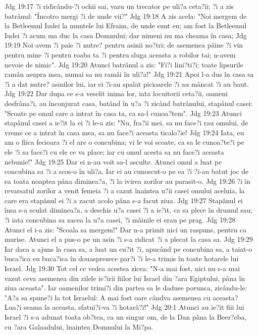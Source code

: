 Jdg 19:17  ?i ridicându-?i ochii sai, vazu un trecator pe uli?a ceta?ii; ?i a zis batrânul: "Încotro mergi ?i de unde vii?"
Jdg 19:18  A zis acela: "Noi mergem de la Betleemul Iudei la muntele lui Efraim, de unde sunt eu; am fost la Betleemul Iudei ?i acum ma duc la casa Domnului; dar nimeni nu ma cheama în casa;
Jdg 19:19  Noi avem ?i paie ?i nutre? pentru asinii no?tri; de asemenea pâine ?i vin pentru mine ?i pentru roaba ta ?i pentru sluga aceasta a robilor tai; n-avem nevoie de nimic".
Jdg 19:20  Atunci batrânul a zis: "Fi?i lini?ti?i; toate lipsurile ramân asupra mea, numai sa nu ramâi în uli?a!"
Jdg 19:21  Apoi l-a dus în casa sa ?i a dat nutre? asinilor lui, iar ei ?i-au spalat picioarele ?i au mâncat ?i au baut.
Jdg 19:22  Dar dupa ce s-a veselit inima lor, iata locuitorii ceta?ii, oameni desfrâna?i, au înconjurat casa, batând în u?a ?i zicând batrânului, stapânul casei: "Scoate pe omul care a intrat în casa ta, ca sa-l cunoa?tem".
Jdg 19:23  Atunci stapânul casei a ie?it la ei ?i le-a zis: "Nu, fra?ii mei, sa nu face?i rau omului, de vreme ce a intrat în casa mea, sa nu face?i aceasta ticalo?ie!
Jdg 19:24  Iata, eu am o fiica fecioara ?i el are o concubina; vi le voi scoate, ca sa le cunoa?te?i pe ele ?i sa face?i cu ele ce va place; iar cu omul acesta sa nu face?i aceasta nebunie!"
Jdg 19:25  Dar ei n-au voit sa-l asculte. Atunci omul a luat pe concubina sa ?i a scos-o în uli?a. Iar ei au cunoscut-o pe ea ?i ?i-au batut joc de ea toata noaptea pâna diminea?a, ?i la ivirea zorilor au parasit-o.
Jdg 19:26  ?i în revarsatul zorilor a venit femeia ?i a cazut înaintea u?ii casei omului aceluia, la care era stapânul ei ?i a zacut acolo pâna s-a facut ziua.
Jdg 19:27  Stapânul ei însa s-a sculat diminea?a, a deschis u?a casei ?i a ie?it, ca sa plece în drumul sau; ?i iata concubina sa zacea la u?a casei, ?i mâinile ei erau pe prag.
Jdg 19:28  Atunci el i-a zis: "Scoala sa mergem!" Dar n-a primit nici un raspuns, pentru ca murise. Atunci el a pus-o pe un asin ?i s-a ridicat ?i a plecat la casa sa.
Jdg 19:29  Iar daca a ajuns la casa sa, a luat un cu?it ?i, apucând pe concubina sa, a taiat-o buca?ica eu buca?ica în douasprezece par?i ?i le-a trimis în toate hotarele lui Israel.
Jdg 19:30  Tot cel ce vedea acestea zicea: "N-a mai fost, nici nu s-a mai vazut ceva asemenea din zilele ie?irii fiilor lui Israel din ?ara Egiptului, pâna în ziua aceasta". Iar oamenilor trimi?i din partea sa le daduse porunca, zicându-le: "A?a sa spune?i la tot Israelul: A mai fost oare cândva asemenea cu aceasta? Lua?i seama la aceasta, sfatui?i-va ?i hotarâ?i!"
Jdg 20:1  Atunci au ie?it fiii lui Israel ?i s-a adunat toata ob?tea, ca un singur om, de la Dan pâna la Beer?eba, cu ?ara Galaadului, înaintea Domnului la Mi?pa.
